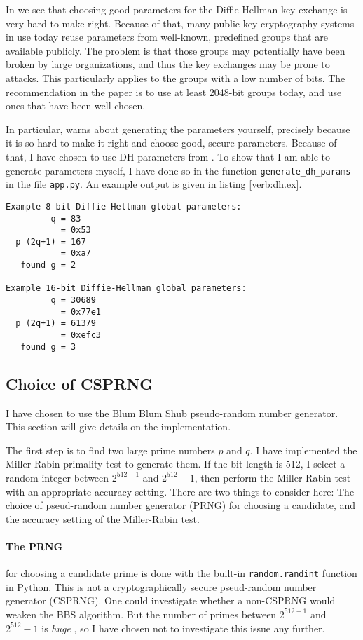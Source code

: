 \documentclass[a4paper,english,12pt]{article}
\begin{document}
In \cite{dh.params} we see that choosing good parameters for the Diffie-Hellman
key exchange is very hard to make right. Because of that, many public key
cryptography systems in use today reuse parameters from well-known, predefined
groups that are available publicly. The problem is that those groups may
potentially have been broken by large organizations, and thus the key exchanges
may be prone to attacks. This particularly applies to the groups with a low
number of bits. The recommendation in the paper is to use at least 2048-bit
groups today, and use ones that have been well chosen. 

In particular, \cite{dh.params} warns about generating the parameters yourself,
precisely because it is so hard to make it right and choose good, secure
parameters. Because of that, I have chosen to use DH parameters from
\cite{rfc3526}. To show that I am able to generate parameters myself, I have
done so in the function \texttt{generate\_dh\_params} in the file
\texttt{app.py}. An example output is given in listing \vref{verb:dh.ex}.

\begin{lstlisting}[caption={Finding Diffie-Hellman parameters}, label=verb:dh.ex]
Example 8-bit Diffie-Hellman global parameters:
         q = 83
           = 0x53
  p (2q+1) = 167
           = 0xa7
   found g = 2

Example 16-bit Diffie-Hellman global parameters:
         q = 30689
           = 0x77e1
  p (2q+1) = 61379
           = 0xefc3
   found g = 3
\end{lstlisting}

\subsection{Choice of CSPRNG}
I have chosen to use the Blum Blum Shub \cite{bbs} pseudo-random number
generator. This section will give details on the implementation.

The first step is to find two large prime numbers $p$ and $q$. I have
implemented the Miller-Rabin \cite{miller.rabin} primality test to generate
them.
%
If the bit length is 512, I select a random integer between $2^{512-1}$ and
$2^{512}-1$, then perform the Miller-Rabin test with an appropriate accuracy
setting. There are two things to consider here: The choice of pseud-random
number generator (PRNG) for choosing a candidate, and the accuracy setting of
the Miller-Rabin test.

\paragraph{The PRNG} for choosing a candidate prime is done with the built-in
\texttt{random.randint} function in Python. This is not a cryptographically
secure pseud-random number generator (CSPRNG). One could investigate whether a
non-CSPRNG would weaken the BBS algorithm. But the number of primes between
$2^{512-1}$ and $2^{512}-1$ is \textit{huge} \cite{wiki:prime.counting}, so I
have chosen not to investigate this issue any further.
\end{document}
